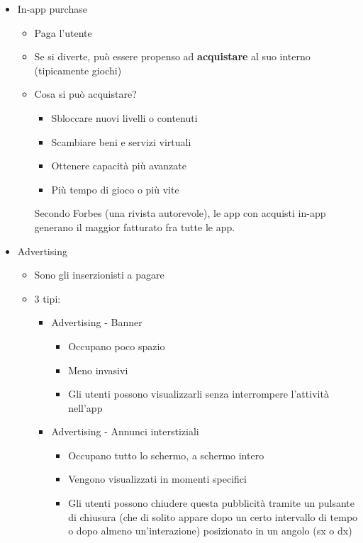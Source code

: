 \begin{itemize}
    \item In-app purchase
    \begin{itemize}
        \item Paga l'utente
        \item Se si diverte, può essere propenso ad \textbf{acquistare} al suo interno (tipicamente giochi)
        \item Cosa si può acquistare?
        \begin{itemize}
            \item Sbloccare nuovi livelli o contenuti
            \item Scambiare beni e servizi virtuali
            \item Ottenere capacità più avanzate
            \item Più tempo di gioco o più vite
        \end{itemize}
        \par Secondo Forbes (una rivista autorevole), le app con acquisti in-app generano il maggior fatturato fra tutte le app.
    \end{itemize}
    \item Advertising
    \begin{itemize}
        \item Sono gli inserzionisti a pagare
        \item 3 tipi:
        \begin{itemize}
            \item Advertising - Banner
            \begin{itemize}
                \item Occupano poco spazio
                \item Meno invasivi
                \item Gli utenti possono visualizzarli senza interrompere l'attività nell'app
            \end{itemize}
            \item Advertising - Annunci interstiziali
            \begin{itemize}
                \item Occupano tutto lo schermo, a schermo intero
                \item Vengono visualizzati in momenti specifici
                \item Gli utenti possono chiudere questa pubblicità tramite un pulsante di chiusura (che di solito appare dopo un certo intervallo di tempo o dopo almeno un'interazione) posizionato in un angolo (sx o dx)

\end{itemize}
\end{itemize}
\end{itemize}
\end{itemize}

